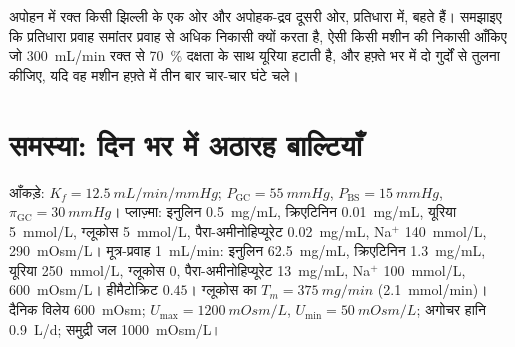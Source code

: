 \begin{exercise}[$\star\star\star$]\label{exo:b3:renal-osmoregulation:12}
अपोहन में रक्त किसी झिल्ली के एक ओर और अपोहक-द्रव दूसरी ओर, प्रतिधारा
में, बहते हैं। समझाइए कि प्रतिधारा प्रवाह समांतर प्रवाह से अधिक निकासी
क्यों करता है, ऐसी किसी मशीन की निकासी आँकिए जो \qty{300}{mL/min} रक्त
से \qty{70}{\%} दक्षता के साथ यूरिया हटाती है, और हफ़्ते भर में दो
गुर्दों से तुलना कीजिए, यदि वह मशीन हफ़्ते में तीन बार चार-चार घंटे
चले।
\end{exercise}

\section{समस्या: दिन भर में अठारह बाल्टियाँ}

\begin{problem}
\label{pb:b3:renal-osmoregulation:1}
आँकड़े: $K_{f} = \qty{12.5}{mL/min/mmHg}$; $P_{\text{GC}} = \qty{55}{mmHg}$,
$P_{\text{BS}} = \qty{15}{mmHg}$, $\pi_{\text{GC}} = \qty{30}{mmHg}$।
प्लाज़्मा: इनुलिन \qty{0.5}{mg/mL}, क्रिएटिनिन \qty{0.01}{mg/mL},
यूरिया \qty{5}{mmol/L}, ग्लूकोस \qty{5}{mmol/L},
पैरा-अमीनोहिप्यूरेट \qty{0.02}{mg/mL}, Na$^{+}$ \qty{140}{mmol/L},
 \qty{290}{mOsm/L}। मूत्र-प्रवाह \qty{1}{mL/min}: इनुलिन
\qty{62.5}{mg/mL}, क्रिएटिनिन \qty{1.3}{mg/mL}, यूरिया
\qty{250}{mmol/L}, ग्लूकोस $0$, पैरा-अमीनोहिप्यूरेट \qty{13}{mg/mL},
Na$^{+}$ \qty{100}{mmol/L},  \qty{600}{mOsm/L}। हीमैटोक्रिट
$0.45$। ग्लूकोस का $T_{m} =
\qty{375}{mg/min}$ (\qty{2.1}{mmol/min})। दैनिक विलेय \qty{600}{mOsm};
$U_{\max} = \qty{1200}{mOsm/L}$, $U_{\min} = \qty{50}{mOsm/L}$;
अगोचर हानि \qty{0.9}{L/d}; समुद्री जल \qty{1000}{mOsm/L}।


\end{problem}
